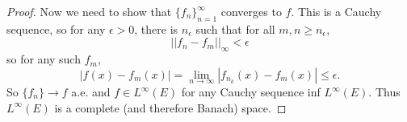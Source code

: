 \begin{pblm}
\begin{proof}
	Now we need to show that $\{f_n\}_{n=1}^\infty$ converges to $f$. This is a Cauchy sequence, so 
	for any $\epsilon > 0$, there is $n_\epsilon$ such that for all $m, n \ge n_\epsilon$, 
	\begin{equation*}
		||f_n - f_m||_\infty < \epsilon
	\end{equation*}
	so for any such $f_m$, 
	\begin{equation*}
		|f(x) - f_m(x)| = \lim\limits_{n\to\infty}|f_{n_k}(x) - f_m(x)| \le \epsilon. 
	\end{equation*}
	So $\{f_n\} \rightarrow f$ a.e. and $f \in L^\infty(E)$ for any Cauchy sequence inf $L^\infty(E)$. 
	Thus $L^\infty(E)$ is a complete (and therefore Banach) space. 
\end{proof}
\end{pblm}


